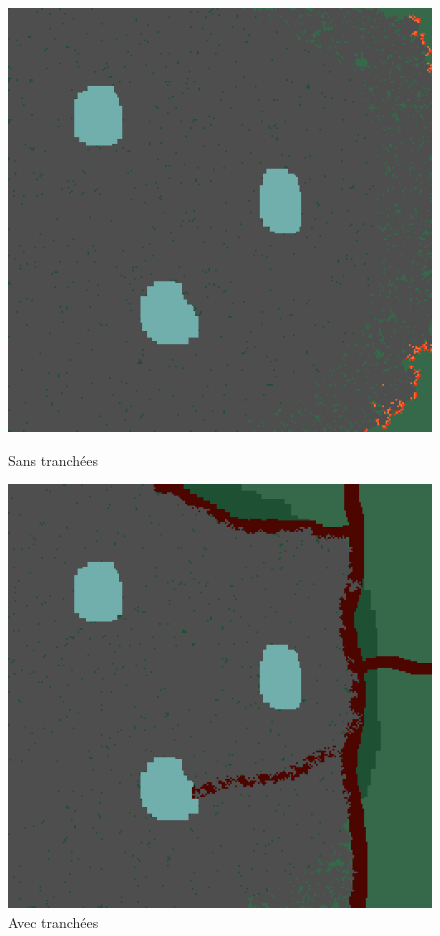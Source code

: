 \documentclass[12pt]{article}
\begin{document}
\begin{figure}[!h]
    \centering
    \begin{minipage}{0.35\textwidth}
      \centering
      \includegraphics[width=.8\linewidth]{pictures/trans/no_treach.png}
      \caption{Sans tranchées}\label{Fig:Data5}
    \end{minipage}\hfill
    \begin{minipage}{0.35\textwidth}
      \centering
      \includegraphics[width=.8\linewidth]{pictures/trans/treach.png}
      \caption{Avec tranchées}\label{Fig:Data6}
    \end{minipage}
\end{figure}
\end{document}

